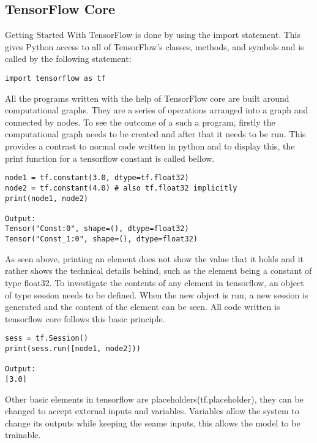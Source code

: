 
\subsection{TensorFlow Core}
Getting Started With TensorFlow is done by using the import statement. 
This gives Python access to all of TensorFlow's classes,
methods, and symbols and is called by the following statement:

\begin{lstlisting}
import tensorflow as tf
\end{lstlisting}

All the programs written with the help of TensorFlow core are built around computational graphs. 
They are a series of operations arranged into a graph and connected by nodes. 
To see the outcome of a such a program, 
firstly the computational graph needs to be created and after that it needs to be run. 
This provides a contrast to normal code written in python and to display this, 
the print function for a tensorflow constant is called bellow.

\begin{lstlisting}
node1 = tf.constant(3.0, dtype=tf.float32)
node2 = tf.constant(4.0) # also tf.float32 implicitly
print(node1, node2)

Output:
Tensor("Const:0", shape=(), dtype=float32)
Tensor("Const_1:0", shape=(), dtype=float32) 
\end{lstlisting}

As seen above, printing an element does not show the value that it holds and it rather shows the technical details behind,
such as the element being a constant of type float32.
To investigate the contents of any element in tensorflow,
an object of type session needs to be defined.
When the new object is run, a new session is generated and the content of the element can be seen.
All code written is tensorflow core follows this basic principle.

\begin{lstlisting}
sess = tf.Session()
print(sess.run([node1, node2]))

Output:
[3.0]
\end{lstlisting}

Other basic elements in tensorflow are
placeholders(tf.placeholder), they can be changed to accept 
external inputs and variables. Variables allow the system to
change its outputs while keeping the seame inputs,
this allows the model to be trainable. 

